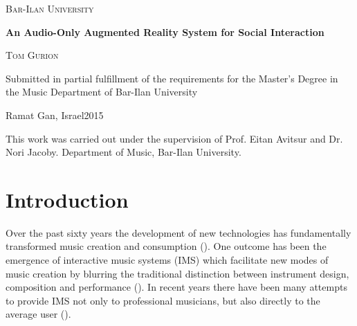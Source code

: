 \documentclass[a4paper,11pt]{article}
\begin{document}

\begin{titlepage}
	\centering
	{\LARGE\scshape Bar-Ilan University\par}
	\vspace{2cm}
	{\LARGE\bfseries An Audio-Only Augmented Reality System for Social Interaction\par}
  \vspace{2cm}
  {\large\scshape Tom Gurion\par}
  \vspace{2cm}
	Submitted in partial fulfillment of the requirements for the Master's Degree in the Music Department of Bar-Ilan University\par
	\vfill  %
	Ramat Gan, Israel\hfill 2015
\end{titlepage}

\begin{titlepage}
  This work was carried out under the supervision of Prof. Eitan Avitsur and Dr. Nori Jacoby. Department of Music, Bar-Ilan University.
\end{titlepage}

\tableofcontents

\clearpage
{}  %
{}
\begin{abstract}
This thesis discusses the development and evaluation of an interactive music system for non-professional musicians.
The system provides a platform for the creation of spatial interactive music consumption experiences.
It is designed for joint music consumption by a group of users in the same place and time, and aims to facilitate social interactions.
Throughout the research the system is presented in the context of a silent disco party.
I conducted two experiments to evaluate the social effects of the system in that context.
My results shows that the system use promote openness and increase the social interaction between different social groups.
\end{abstract}

\clearpage\section{Introduction}

Over the past sixty years the development of new technologies has fundamentally transformed music creation and consumption (\cite{hargreaves99}).
One outcome has been the emergence of interactive music systems (IMS) which facilitate new modes of music creation by blurring the traditional distinction between instrument design, composition and performance (\cite{drummond09}).
In recent years there have been many attempts to provide IMS not only to professional musicians, but also directly to the average user (\cite{stimulant13}).
\end{document}
